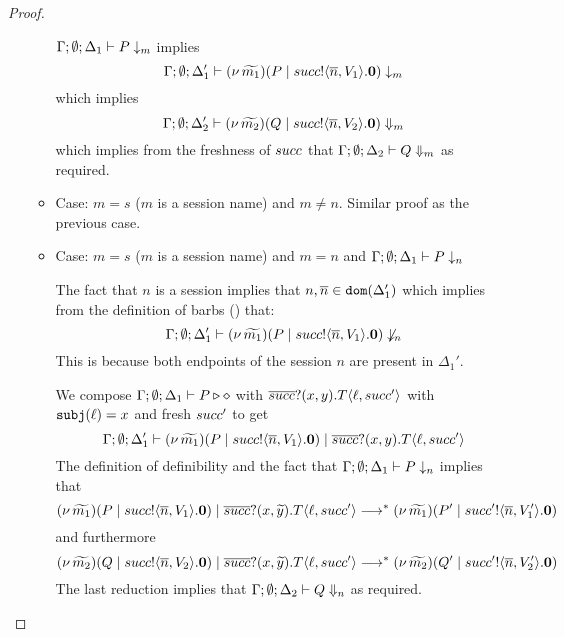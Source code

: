 \begin{proof}
\begin{itemize}
\begin{itemize}
						$\Gamma; \emptyset; \Delta_1 \vdash P \downarrow_{m}$
						implies
						\[
							\Gamma; \emptyset; \Delta_1' \vdash
							(\nu\, \widetilde{m_1})(P \;|\; succ ! \langle \overline{n}, V_1 \rangle . \mathbf{0})
							\downarrow_{m}
						\]
						which implies
						\[
							\Gamma; \emptyset; \Delta_2' \vdash
							(\nu\, \widetilde{m_2})(Q \;|\; succ ! \langle \overline{n}, V_2 \rangle . \mathbf{0})
							\Downarrow_{m}
						\]
						which implies from the freshness of $succ$ that
						$\Gamma; \emptyset; \Delta_2 \vdash Q \Downarrow_{m}$ as required.

				\item	Case: $m = s$ ($m$ is a session name) and $m \not= n$.
						Similar proof as the previous case.

				\item	Case: $m = s$ ($m$ is a session name) and $m = n$ and
						$\Gamma; \emptyset; \Delta_1 \vdash P \downarrow_{n}$
						
						The fact that $n$ is a session 
						implies that $n, \overline{n} \in \mathtt{dom}(\Delta_1')$
						which implies from the definition
						of barbs () that:
						\[
							\Gamma; \emptyset; \Delta_1' \vdash
							(\nu\, \widetilde{m_1})(P \;|\; succ ! \langle \overline{n}, V_1 \rangle . \mathbf{0})
							\not\downarrow_{n}
						\]
						This is because both endpoints of the session $n$
						are present in $\Delta_1'$.


						We compose $\Gamma; \emptyset; \Delta_1 \vdash P \triangleright \diamond$ with
						$\overline{succ} ? (x, y) . T\langle \ell, succ' \rangle$
						with $\mathtt{subj}(\ell) = x$ and fresh $succ'$ to get
						\[
							\Gamma; \emptyset; \Delta_1' \vdash
							(\nu\, \widetilde{m_1})(P \;|\; succ ! \langle \overline{n}, V_1 \rangle . \mathbf{0}) \;|\;
							\overline{succ} ? (x, y) . T\langle \ell, succ' \rangle
						\]
						The definition of definibility and the fact that $\Gamma; \emptyset; \Delta_1 \vdash P \downarrow_{n}$
						implies that
						\[
							(\nu\, \widetilde{m_1})(P \;|\; succ ! \langle \overline{n}, V_1 \rangle . \mathbf{0}) \;|\;
							\overline{succ} ? (x, \widetilde{y}) . T\langle \ell, succ' \rangle
							\longrightarrow^{*} 
							(\nu\, \widetilde{m_1})(P' \;|\; succ' ! \langle \overline{n}, V_1' \rangle . \mathbf{0})
						\]
						\noi and furthermore
						\[
							(\nu\, \widetilde{m_2})(Q \;|\; succ ! \langle \overline{n}, V_2 \rangle . \mathbf{0}) \;|\;
							\overline{succ} ? (x, \widetilde{y}) . T\langle \ell, succ' \rangle
							\longrightarrow^{*} 
							(\nu\, \widetilde{m_2})(Q' \;|\; succ' ! \langle \overline{n}, V_2' \rangle . \mathbf{0})
						\]
						\noi The last reduction implies that
						$\Gamma; \emptyset; \Delta_2 \vdash Q \Downarrow_{n}$ as required.
				\end{itemize}
    

\end{itemize}
\end{proof}
